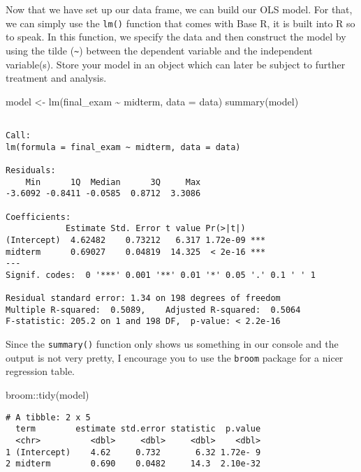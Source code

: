 \documentclass[
  letterpaper,
  DIV=11,
  numbers=noendperiod]{scrreprt}
\newenvironment{Shaded}{\begin{snugshade}}{\end{snugshade}}
\newcommand{\AttributeTok}[1]{\textcolor[rgb]{0.40,0.45,0.13}{#1}}
\newcommand{\FunctionTok}[1]{\textcolor[rgb]{0.28,0.35,0.67}{#1}}
\newcommand{\NormalTok}[1]{\textcolor[rgb]{0.00,0.23,0.31}{#1}}
\newcommand{\OtherTok}[1]{\textcolor[rgb]{0.00,0.23,0.31}{#1}}
\newcommand{\SpecialCharTok}[1]{\textcolor[rgb]{0.37,0.37,0.37}{#1}}
\begin{document}
Now that we have set up our data frame, we can build our OLS model. For
that, we can simply use the \texttt{lm()} function that comes with Base
R, it is built into R so to speak. In this function, we specify the data
and then construct the model by using the tilde
(\texttt{\textasciitilde{}}) between the dependent variable and the
independent variable(s). Store your model in an object which can later
be subject to further treatment and analysis.

\begin{Shaded}
\begin{Highlighting}[]
\NormalTok{model }\OtherTok{\textless{}{-}} \FunctionTok{lm}\NormalTok{(final\_exam }\SpecialCharTok{\textasciitilde{}}\NormalTok{ midterm, }\AttributeTok{data =}\NormalTok{ data)}
\FunctionTok{summary}\NormalTok{(model)}
\end{Highlighting}
\end{Shaded}

\begin{verbatim}

Call:
lm(formula = final_exam ~ midterm, data = data)

Residuals:
    Min      1Q  Median      3Q     Max 
-3.6092 -0.8411 -0.0585  0.8712  3.3086 

Coefficients:
            Estimate Std. Error t value Pr(>|t|)    
(Intercept)  4.62482    0.73212   6.317 1.72e-09 ***
midterm      0.69027    0.04819  14.325  < 2e-16 ***
---
Signif. codes:  0 '***' 0.001 '**' 0.01 '*' 0.05 '.' 0.1 ' ' 1

Residual standard error: 1.34 on 198 degrees of freedom
Multiple R-squared:  0.5089,    Adjusted R-squared:  0.5064 
F-statistic: 205.2 on 1 and 198 DF,  p-value: < 2.2e-16
\end{verbatim}

Since the \texttt{summary()} function only shows us something in our
console and the output is not very pretty, I encourage you to use the
\texttt{broom} package for a nicer regression table.

\begin{Shaded}
\begin{Highlighting}[]
\NormalTok{broom}\SpecialCharTok{::}\FunctionTok{tidy}\NormalTok{(model)}
\end{Highlighting}
\end{Shaded}

\begin{verbatim}
# A tibble: 2 x 5
  term        estimate std.error statistic  p.value
  <chr>          <dbl>     <dbl>     <dbl>    <dbl>
1 (Intercept)    4.62     0.732       6.32 1.72e- 9
2 midterm        0.690    0.0482     14.3  2.10e-32
\end{verbatim}
\end{document}
